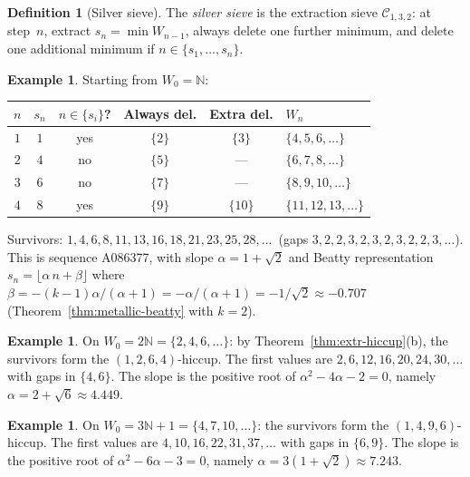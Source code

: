 \documentclass[11pt]{article}
\numberwithin{equation}{section}
\theoremstyle{plain}
\theoremstyle{definition}
\newtheorem{definition}[theorem]{Definition}
\newtheorem{example}[theorem]{Example}
\theoremstyle{remark}
\newcommand{\N}{\mathbb{N}}
\begin{document}
\begin{definition}[Silver sieve]\label{def:silver}
The \emph{silver sieve} is the extraction sieve $\mathcal{C}_{1,3,2}$:
at step~$n$, extract $s_n=\min W_{n-1}$, always delete one further
minimum, and delete one additional minimum if $n\in\{s_1,\ldots,s_n\}$.
\end{definition}

\begin{example}\label{ex:silver-N}
Starting from $W_0=\N$:
\begin{center}\small
\begin{tabular}{@{}cccccl@{}}
\toprule
$n$ & $s_n$ & $n\in\{s_i\}$? & Always del. & Extra del. & $W_n$ \\
\midrule
$1$ & $1$ & yes & $\{2\}$ & $\{3\}$ & $\{4,5,6,\ldots\}$ \\
$2$ & $4$ & no  & $\{5\}$ & ---     & $\{6,7,8,\ldots\}$ \\
$3$ & $6$ & no  & $\{7\}$ & ---     & $\{8,9,10,\ldots\}$ \\
$4$ & $8$ & yes & $\{9\}$ & $\{10\}$ & $\{11,12,13,\ldots\}$ \\
\bottomrule
\end{tabular}
\end{center}
Survivors: $1,4,6,8,11,13,16,18,21,23,25,28,\ldots$\,
(gaps $3,2,2,3,2,3,2,3,2,2,3,\ldots$).
This is sequence A086377, with slope $\alpha=1+\sqrt{2}$ and
Beatty representation $s_n=\lfloor\alpha\,n+\beta\rfloor$
where $\beta=-(k{-}1)\alpha/(\alpha{+}1)=-\alpha/(\alpha{+}1)
=-1/\sqrt{2}\approx -0.707$
(Theorem~\ref{thm:metallic-beatty} with $k=2$).
\end{example}

\begin{example}\label{ex:silver-2N}
On $W_0=2\N=\{2,4,6,\ldots\}$:
by Theorem~\ref{thm:extr-hiccup}(b), the survivors form
the $(1,2,6,4)$-hiccup.  The first values are
$2,6,12,16,20,24,30,\ldots$ with gaps in $\{4,6\}$.
The slope is the positive root of $\alpha^2-4\alpha-2=0$,
namely $\alpha=2+\sqrt{6}\approx 4.449$.
\end{example}

\begin{example}\label{ex:silver-3N1}
On $W_0=3\N+1=\{4,7,10,\ldots\}$:
the survivors form the $(1,4,9,6)$-hiccup.  The first values are
$4,10,16,22,31,37,\ldots$ with gaps in $\{6,9\}$.
The slope is the positive root of $\alpha^2-6\alpha-3=0$,
namely $\alpha=3(1+\sqrt{2})\approx 7.243$.
\end{example}
\end{document}
